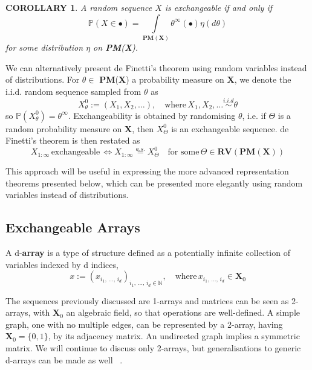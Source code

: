 \documentclass[12pt]{report}
\newtheorem{corollary}[theorem]{COROLLARY}
\newcommand{\bs}{\boldsymbol}
\newcommand{\mb}[1]{\mathbb{#1}}
\renewcommand{\bs}{\boldsymbol}
\begin{document}
\begin{corollary}
    A random sequence $X$ is exchangeable if and only if 
    \begin{equation}
        \mb{P}(X \in \bullet) = \int\limits_{\bs{P}\bs{M}(\bs{X})} \theta^\infty(\bullet) \eta(d\theta)
    \end{equation}
    for some distribution $\eta$ on \textbf{PM}(\textbf{X}).
\end{corollary}

We can alternatively present de Finetti's theorem using random variables instead of distributions. For $\theta \in$ \textbf{PM}(\textbf{X}) a probability measure on \textbf{X}, we denote the i.i.d. random sequence sampled from $\theta$ as
\begin{equation*}
    X_\theta^0 := (X_1, X_2,\dots),\quad\text{where}\, X_1, X_2,\dots \overset{i.i.d}{\sim} \theta
\end{equation*}
so $\mb{P}(X_\theta^0) = \theta^\infty$. Exchangeability is obtained by randomising $\theta$, i.e. if $\Theta$ is a random probability measure on \textbf{X}, then $X_\Theta^0$ is an exchangeable sequence. de Finetti's theorem is then restated as
\begin{equation}
    X_{1:\infty}\, \text{exchangeable}\, \Leftrightarrow X_{1:\infty} \overset{a.s.}{=} X_\Theta^0 \quad \text{for some}\, \Theta \in \bs{R}\bs{V}(\bs{P}\bs{M}(\bs{X}))
\end{equation}

This approach will be useful in expressing the more advanced representation theorems presented below, which can be presented more elegantly using random variables instead of distributions. \\

\subsection{Exchangeable Arrays}

A d-\textbf{array} is a type of structure defined as a potentially infinite collection of variables indexed by d indices,
\begin{equation}
    x := (x_{i_1,\,\dots,\,i_d})_{i_1,\,\dots,\,i_d \in \mb{N}},\quad \text{where}\, x_{i_1,\,\dots,\,i_d} \in \bs{X}_0
\end{equation}

The sequences previously discussed are 1-arrays and matrices can be seen as 2-arrays, with $\bs{X}_0$ an algebraic field, so that operations are well-defined. A simple graph, one with no multiple edges, can be represented by a 2-array, having $\bs{X}_0 = \{0, 1\}$, by its adjacency matrix. An undirected graph implies a symmetric matrix. We will continue to discuss only 2-arrays, but generalisations to generic d-arrays can be made as well ~\parencite{exchangeableorbanz}. \\
\end{document}
